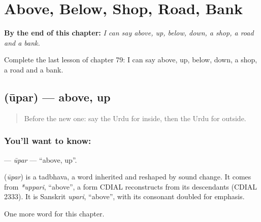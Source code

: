 
\chapter{Above, Below, Shop, Road, Bank}
\label{ch:ur-above-below-shop-road-bank}

\begin{chapteropening}
\textbf{By the end of this chapter:} \emph{I can say above, up, below, down, a shop, a road and a bank.}

Complete the last lesson of chapter 79: I can say above, up, below, down, a shop, a road and a bank.
\end{chapteropening}

\section[\texorpdfstring{\ur{اوپر} (ūpar)}{اوپر (ūpar)}]{ (ūpar) — above, up}

\label{lesson:UR-C79-upar}



\begin{quote}
Before the new one: say the Urdu for inside, then the Urdu for outside.
\end{quote}

\subsection*{You'll want to know: }
\textbf{} — \emph{ūpar} — \textquotedblleft{}above, up\textquotedblright{}.

\begin{cousinweb}
\textbf{} (\emph{ūpar}) is a tadbhava, a word inherited and reshaped by sound change. It comes from \emph{*uppari}, \textquotedblleft{}above\textquotedblright{}, a form CDIAL reconstructs from its descendants (CDIAL 2333). It is Sanskrit \emph{upari}, \textquotedblleft{}above\textquotedblright{}, with its consonant doubled for emphasis.
\end{cousinweb}

\begin{grammarlens}[title={What you've built}]
One more word for this chapter.
\end{grammarlens}

